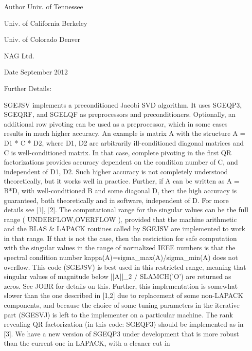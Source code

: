\begin{DoxyAuthor}{Author}
Univ. of Tennessee 

Univ. of California Berkeley 

Univ. of Colorado Denver 

N\+A\+G Ltd. 
\end{DoxyAuthor}
\begin{DoxyDate}{Date}
September 2012 
\end{DoxyDate}
\begin{DoxyParagraph}{Further Details\+: }
\begin{DoxyVerb}  SGEJSV implements a preconditioned Jacobi SVD algorithm. It uses SGEQP3,
  SGEQRF, and SGELQF as preprocessors and preconditioners. Optionally, an
  additional row pivoting can be used as a preprocessor, which in some
  cases results in much higher accuracy. An example is matrix A with the
  structure A = D1 * C * D2, where D1, D2 are arbitrarily ill-conditioned
  diagonal matrices and C is well-conditioned matrix. In that case, complete
  pivoting in the first QR factorizations provides accuracy dependent on the
  condition number of C, and independent of D1, D2. Such higher accuracy is
  not completely understood theoretically, but it works well in practice.
  Further, if A can be written as A = B*D, with well-conditioned B and some
  diagonal D, then the high accuracy is guaranteed, both theoretically and
  in software, independent of D. For more details see [1], [2].
     The computational range for the singular values can be the full range
  ( UNDERFLOW,OVERFLOW ), provided that the machine arithmetic and the BLAS
  & LAPACK routines called by SGEJSV are implemented to work in that range.
  If that is not the case, then the restriction for safe computation with
  the singular values in the range of normalized IEEE numbers is that the
  spectral condition number kappa(A)=sigma_max(A)/sigma_min(A) does not
  overflow. This code (SGEJSV) is best used in this restricted range,
  meaning that singular values of magnitude below ||A||_2 / SLAMCH('O') are
  returned as zeros. See JOBR for details on this.
     Further, this implementation is somewhat slower than the one described
  in [1,2] due to replacement of some non-LAPACK components, and because
  the choice of some tuning parameters in the iterative part (SGESVJ) is
  left to the implementer on a particular machine.
     The rank revealing QR factorization (in this code: SGEQP3) should be
  implemented as in [3]. We have a new version of SGEQP3 under development
  that is more robust than the current one in LAPACK, with a cleaner cut in

\end{DoxyVerb}
\end{DoxyParagraph}
